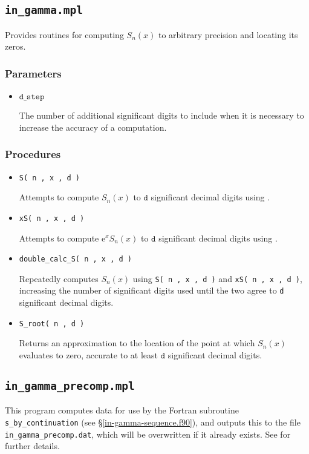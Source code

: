 \documentclass[paper=a4,smallheadings]{scrartcl}
\newcommand{\re} {\mathrm e}
\begin{document}
\subsection{\texttt{in\_gamma.mpl}}
\label{in-gamma.mpl}
Provides routines for computing $S_n(x)$
to arbitrary precision and locating its zeros.
%
\subsubsection*{Parameters}
\begin{itemize}
\item $\mathtt{d\_step}$ \par The number of additional significant digits to include
when it is necessary to increase the accuracy of a computation.
\end{itemize}
%
\subsubsection*{Procedures}
\begin{itemize}
\item \verb+S( n , x , d )+ \par  Attempts to compute $S_n(x)$ to $\mathtt{d}$ significant 
                                  decimal digits using \cite[(28)]{Thompson11b}.
\item \verb+xS( n , x , d )+ \par Attempts to compute $\re^xS_n(x)$ to $\mathtt{d}$ significant 
                                  decimal digits using \cite[(12)]{Thompson11b}.
\item \verb+double_calc_S( n , x , d )+ \par Repeatedly computes $S_n(x)$ using \verb+S( n , x , d )+
                 and \verb+xS( n , x , d )+, increasing the number of significant digits used until
                 the two agree to \verb+d+ significant decimal digits.
\item \verb+S_root( n , d )+ \par Returns an approximation to the location of the
  point at which $S_n(x)$ evaluates to zero, accurate to at least $\mathtt{d}$ significant
  decimal digits.
\end{itemize}
%
\subsection{\texttt{in\_gamma\_precomp.mpl}}
\label{in-gamma-precomp.mpl}
This program computes data for use by the Fortran subroutine
\texttt{s\_by\_continuation} (see \S\ref{in-gamma-sequence.f90}), and
outputs this to the file \texttt{in\_gamma\_precomp.dat}, which will
be overwritten if it already exists.  See
\cite[\S7]{Thompson11b} for further details.
%
\end{document}
